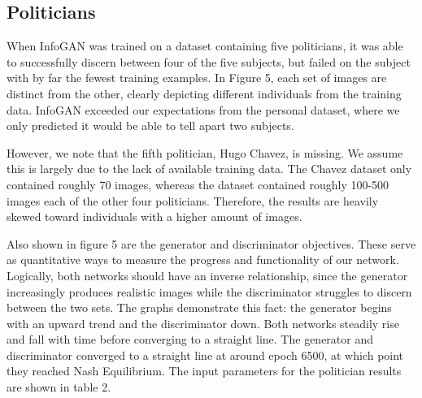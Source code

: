 \documentclass[conference,11pt]{IEEEtran}
\begin{document}

\subsection{Politicians}

When InfoGAN was trained on a dataset containing five politicians, it was able to successfully discern between four of the five subjects, but failed on the subject with by far the fewest training examples.  In Figure 5, each set of images are distinct from the other, clearly depicting different individuals from the training data.  InfoGAN exceeded our expectations from the personal dataset, where we only predicted it would be able to tell apart two subjects.

However, we note that the fifth politician, Hugo Chavez, is missing.  We assume this is largely due to the lack of available training data.  The Chavez dataset only contained roughly 70 images, whereas the dataset contained roughly 100-500 images each of the other four politicians.  Therefore, the results are heavily skewed toward individuals with a higher amount of images.

Also shown in figure 5 are the generator and discriminator objectives.  These serve as quantitative ways to measure the progress and functionality of our network.  Logically, both networks should have an inverse relationship, since the generator increasingly produces realistic images while the discriminator struggles to discern between the two sets.  The graphs demonstrate this fact: the generator begins with an upward trend and the discriminator down.  Both networks steadily rise and fall with time before converging to a straight line.  The generator and discriminator converged to a straight line at around epoch 6500, at which point they reached Nash Equilibrium.   The input parameters for the politician results are shown in table 2.
\end{document}
